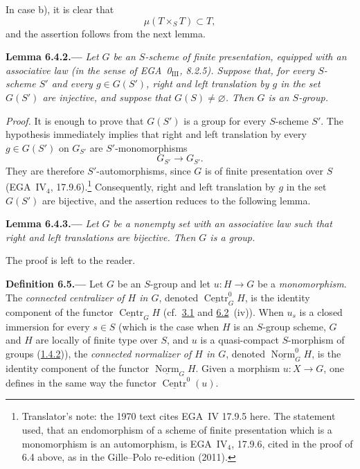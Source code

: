 In case \textup{b)}, it is clear that
\[
  \mu(T\times_S T)\subset T,
\]
and the assertion follows from the next lemma.

\medskip
{}\label{lem:sga3-VIB-6.4.2}%
\noindent\textbf{Lemma 6.4.2.---}%
\emph{Let \(G\) be an \(S\)-scheme of finite presentation,
equipped with an associative law (in the sense of
EGA~0\(_{\mathrm{III}}\), 8.2.5). Suppose that, for every
\(S\)-scheme \(S'\) and every \(g\in G(S')\), right and left
translation by \(g\) in the set \(G(S')\) are injective, and
suppose that \(G(S)\ne\varnothing\). Then \(G\) is an
\(S\)-group.}

\emph{Proof.}
It is enough to prove that \(G(S')\) is a group for every
\(S\)-scheme \(S'\). The hypothesis immediately implies that
right and left translation by every \(g\in G(S')\) on
\(G_{S'}\) are \(S'\)-monomorphisms
\[
  G_{S'}\longrightarrow G_{S'}.
\]
They are therefore \(S'\)-automorphisms, since \(G\) is of
finite presentation over \(S\) (EGA~IV\(_4\), 17.9.6).\footnote{Translator's note: the 1970 text cites EGA~IV
17.9.5 here. The statement used, that an endomorphism of a scheme of finite presentation which is a monomorphism
is an automorphism, is EGA~IV\(_4\), 17.9.6, cited in the proof of 6.4 above, as in the Gille--Polo re-edition
(2011).}
Consequently, right and left translation by \(g\) in the set
\(G(S')\) are bijective, and the assertion reduces to the
following lemma.

\medskip
{}\label{lem:sga3-VIB-6.4.3}%
\noindent\textbf{Lemma 6.4.3.---}
\emph{Let \(G\) be a nonempty set with an associative law such
that right and left translations are bijective. Then \(G\) is a
group.}

The proof is left to the reader.

\medskip
{}\label{def:sga3-VIB-6.5}%
\noindent\textbf{Definition 6.5.---}
Let \(G\) be an \(S\)-group and let \(u:H\to G\) be a
\emph{monomorphism}. The \emph{connected centralizer of \(H\) in \(G\)},
denoted \(\underline{\operatorname{Centr}}^0_G H\), is the identity
component of the functor \(\underline{\operatorname{Centr}}_G H\)
(cf.\ \hyperref[def:sga3-VIB-3.1]{3.1} and
\hyperref[prop:sga3-VIB-6.2]{6.2}~\textup{(iv)}). When \(u_s\) is a closed
immersion for every \(s\in S\) (which is the case when \(H\) is an
\(S\)-group scheme, \(G\) and \(H\) are locally of finite type over \(S\),
and \(u\) is a quasi-compact \(S\)-morphism of groups
(\hyperref[cor:sga3-VIB-1.4.2]{1.4.2})), the \emph{connected normalizer of
\(H\) in \(G\)}, denoted \(\underline{\operatorname{Norm}}^0_G H\), is the
identity component of the functor \(\underline{\operatorname{Norm}}_G H\).
Given a morphism \(u:X\to G\), one defines in the same way the functor
\(\underline{\operatorname{Centr}}^0(u)\).
